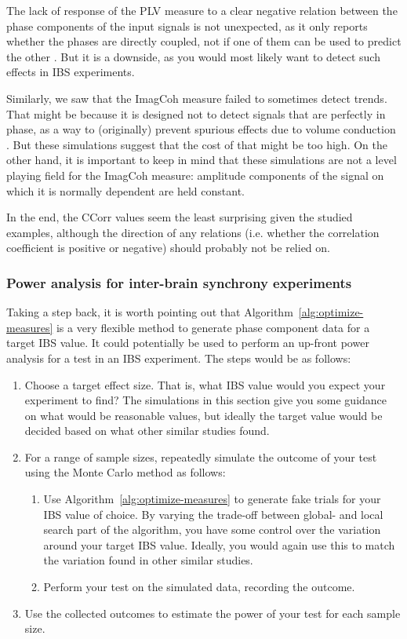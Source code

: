 The lack of response of the PLV measure to a clear negative relation between the
phase components of the input signals is not unexpected, as it only reports
whether the phases are directly coupled, not if one of them can be used to
predict the other \parencite{burgess_interpretation_2013}. But it is a downside,
as you would most likely want to detect such effects in IBS experiments.

Similarly, we saw that the ImagCoh measure failed to
sometimes detect trends. That might be because it is designed not to detect
signals that are perfectly in phase, as a way to (originally) prevent spurious
effects due to volume conduction \parencite{nolte_identifying_2004}. But these
simulations suggest that the cost of that might be too high. On the other hand,
it is important to keep in mind that these simulations are not a level playing
field for the ImagCoh measure: amplitude components of the
signal on which it is normally dependent are held constant.

In the end, the CCorr values seem the least surprising
given the studied examples, although the direction of any relations (i.e.
whether the correlation coefficient is positive or negative) should probably not
be relied on.

\subsubsection{Power analysis for inter-brain synchrony experiments}

Taking a step back, it is worth pointing out that
Algorithm~\ref{alg:optimize-measures} is a very flexible method to generate
phase component data for a target IBS value. It could potentially be used to
perform an up-front power analysis for a test in an IBS experiment. The steps
would be as follows:

\begin{enumerate}
  \item Choose a target effect size. That is, what IBS value would you
  expect your experiment to find? The simulations in this section give you some
  guidance on what would be reasonable values, but ideally the target value
  would be decided based on what other similar studies found.
  \item For a range of sample sizes, repeatedly simulate the outcome of your
  test using the Monte Carlo method
  \parencite[p.~150 gives a nice introduction]{cohen_empirical_1995} as
  follows:
  \begin{enumerate}
    \item Use Algorithm~\ref{alg:optimize-measures} to generate fake trials
    for your IBS value of choice. By varying the trade-off between global- and
    local search part of the algorithm, you have some control over the variation
    around your target IBS value. Ideally, you would again use this to match
    the variation found in other similar studies.
    \item Perform your test on the simulated data, recording the outcome.
  \end{enumerate}
  \item Use the collected outcomes to estimate the power of your test for each
  sample size.
\end{enumerate}

